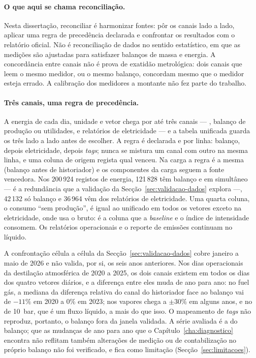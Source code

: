 \paragraph{O que aqui se chama reconciliação.} Nesta dissertação,
reconciliar é harmonizar fontes: pôr os canais lado a lado, aplicar uma
regra de precedência declarada e confrontar os resultados com o relatório
oficial. Não é reconciliação de dados no sentido estatístico, em que as
medições são ajustadas para satisfazer balanços de massa e energia.
 A concordância entre canais não é prova de exatidão
metrológica: dois canais
que leem o mesmo medidor, ou o mesmo balanço, concordam mesmo que o medidor
esteja errado. A calibração dos medidores a montante não fez parte do
trabalho.

\paragraph{Três canais, uma regra de precedência.} A energia de cada
dia, unidade e vetor chega por até três canais --- ,
balanço de produção ou utilidades, e relatórios de eletricidade --- e a tabela unificada guarda os três lado a lado antes de
escolher. A regra é declarada e por linha: balanço, depois eletricidade,
depois \emph{tags}; nunca se mistura um canal com outro na mesma linha, e
uma coluna de origem regista qual venceu. Na carga a regra é a mesma
(balanço antes de historiador) e os componentes da carga seguem a fonte
vencedora. Nos 200\,924 registos de energia, 121\,828 têm balanço e
 em simultâneo --- é a redundância que a validação da
Secção~\ref{sec:validacao-dados} explora ---, 42\,132 só balanço e 36\,964
vêm dos relatórios de eletricidade. Uma quarta coluna, o consumo ``sem
produção'', é igual ao unificado em todos os vetores exceto na
eletricidade, onde usa o bruto: é a coluna que a \emph{baseline} e o índice
de intensidade consomem. Os relatórios operacionais e o reporte de
emissões continuam no líquido.

A confrontação célula a célula da Secção~\ref{sec:validacao-dados} cobre
janeiro a maio de 2026 e não valida, por si, os seis anos anteriores. Nos
dias operacionais da destilação atmosférica de 2020 a 2025, os dois canais
existem em todos os dias dos quatro vetores diários, e a diferença entre
eles muda de ano para ano: no fuel gás, a mediana da diferença relativa do
canal do historiador face ao balanço vai de $-11\%$ em 2020 a $0\%$ em 2023;
nos vapores chega a $\pm30\%$ em alguns anos, e no de 10~bar, que é um fluxo
líquido, a mais do que isso. O mapeamento de \emph{tags} não reproduz, portanto,
o balanço fora da janela validada. A série avaliada é a do balanço; que as
mudanças de ano para ano que o Capítulo~\ref{cha:diagnostico} encontra não
reflitam também alterações de medição ou de contabilização no próprio
balanço não foi verificado, e fica como limitação
(Secção~\ref{sec:limitacoes}).

